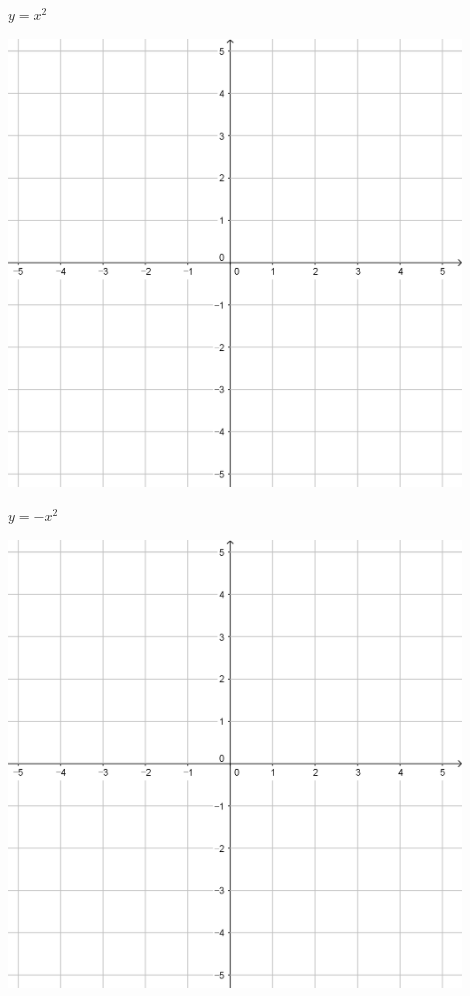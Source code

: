 \documentclass{oblivoir}
\begin{document}
\begin{minipage}{0.45\textwidth}\centering
\(y=x^2\)
\par\bigskip\includegraphics[width=0.9\textwidth]{55}
\end{minipage}
\begin{minipage}{0.45\textwidth}\centering
\(y=-x^2\)
\par\bigskip\includegraphics[width=0.9\textwidth]{55}
\end{minipage}\bigskip\bigskip\par
\end{document}
